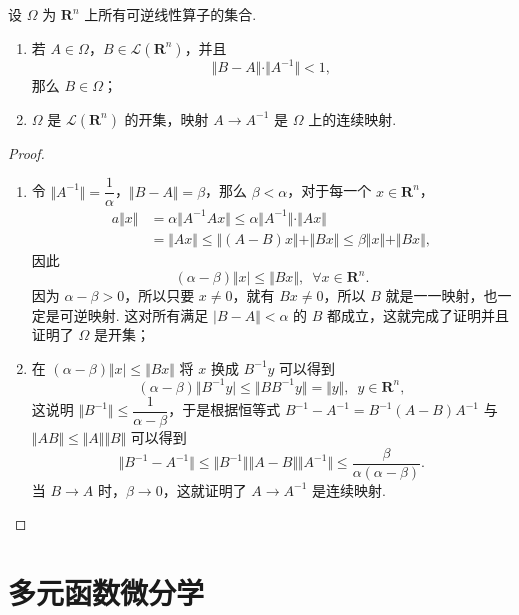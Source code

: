 \begin{theorem}{}{}
    设 $\Omega$ 为 $\mathbf{R}^n$ 上所有可逆线性算子的集合.
    \begin{enumerate}
        \item 若 $A\in \Omega$，$B\in \mathcal{L}(\mathbf{R}^n)$，并且 \[\Vert B-A\Vert\cdot\Vert A^{-1}\Vert < 1,\]那么 $B\in \Omega$；
        \item $\Omega$ 是 $\mathcal{L}(\mathbf{R}^n)$ 的开集，映射 $A\to A^{-1}$ 是 $\Omega$ 上的连续映射.
    \end{enumerate}
\end{theorem}

\begin{proof}
    \begin{enumerate}
        \item 令 $\Vert A^{-1}\Vert = \dfrac{1}{\alpha}$，$\Vert B-A\Vert = \beta$，那么 $\beta < \alpha$，对于每一个 $x\in \mathbf{R}^n$，
        \[\begin{aligned}
            a\Vert x\Vert &= \alpha\Vert A^{-1}Ax\Vert \leqslant \alpha \Vert A^{-1}\Vert \cdot \Vert Ax \Vert \\
            &= \Vert Ax\Vert \leqslant \Vert (A - B)x\Vert + \Vert Bx\Vert \leqslant \beta\Vert x\Vert + \Vert Bx\Vert,
        \end{aligned}\]
        因此 \[(\alpha - \beta)\Vert x\vert \leqslant \Vert Bx\Vert,\enspace \forall x\in \mathbf{R}^n.\]
        因为 $\alpha - \beta > 0$，所以只要 $x\neq 0$，就有 $Bx\neq 0$，所以 $B$ 就是一一映射，也一定是可逆映射. 这对所有满足 $\vert B - A\Vert < \alpha$ 的 $B$ 都成立，这就完成了证明并且证明了 $\Omega$ 是开集；
        \item 在 $(\alpha - \beta)\Vert x\vert \leqslant \Vert Bx\Vert$ 将 $x$ 换成 $B^{-1}y$ 可以得到 \[(\alpha - \beta)\Vert B^{-1}y\vert \leqslant \Vert BB^{-1}y\Vert = \Vert y\Vert,\enspace y\in \mathbf{R}^n,\]
        这说明 $\Vert B^{-1}\Vert \leqslant \dfrac{1}{\alpha - \beta}$，于是根据恒等式 $B^{-1} - A^{-1} = B^{-1}(A - B)A^{-1}$ 与 $\Vert AB\Vert \leqslant \Vert A\Vert \Vert B\Vert$ 可以得到 \[\Vert B^{-1} - A^{-1}\Vert \leqslant \Vert B^{-1}\Vert\Vert A - B\Vert\Vert A^{-1}\Vert \leqslant \dfrac{\beta}{\alpha(\alpha - \beta)}.\]
        当 $B\to A$ 时，$\beta\to 0$，这就证明了 $A\to A^{-1}$ 是连续映射.
    \end{enumerate}
\end{proof}

\section{多元函数微分学}

